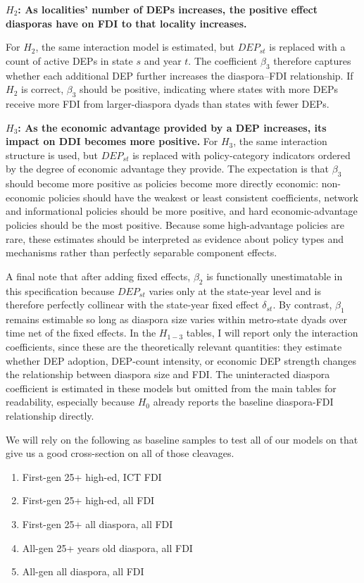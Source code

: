 \documentclass[12pt]{article}
\begin{document}
\textbf{$H_2$: As localities' number of DEPs increases, the positive effect diasporas have on FDI to that locality increases.}

For $H_2$, the same interaction model is estimated, but $DEP_{st}$ is replaced with a count of active DEPs in state $s$ and year $t$. The coefficient $\beta_3$ therefore captures whether each additional DEP further increases the diaspora--FDI relationship. If $H_2$ is correct, $\beta_3$ should be positive, indicating where states with more DEPs receive more FDI from larger-diaspora dyads than states with fewer DEPs.

\textbf{$H_3$: As the economic advantage provided by a DEP increases, its impact on DDI becomes more positive.
}
For $H_3$, the same interaction structure is used, but $DEP_{st}$ is replaced with policy-category indicators ordered by the degree of economic advantage they provide. The expectation is that $\beta_3$ should become more positive as policies become more directly economic: non-economic policies should have the weakest or least consistent coefficients, network and informational policies should be more positive, and hard economic-advantage policies should be the most positive. Because some high-advantage policies are rare, these estimates should be interpreted as evidence about policy types and mechanisms rather than perfectly separable component effects.

A final note that after adding fixed effects, $\beta_2$ is functionally unestimatable in this specification because $DEP_{st}$ varies only at the state-year level and is therefore perfectly collinear with the state-year fixed effect $\delta_{st}$. By contrast, $\beta_1$ remains estimable so long as diaspora size varies within metro-state dyads over time net of the fixed effects. In the $H_{1-3}$ tables, I will report only the interaction coefficients, since these are the theoretically relevant quantities: they estimate whether DEP adoption, DEP-count intensity, or economic DEP strength changes the relationship between diaspora size and FDI. The uninteracted diaspora coefficient is estimated in these models but omitted from the main tables for readability, especially because $H_0$ already reports the baseline diaspora-FDI relationship directly.

We will rely on the following as baseline samples to test all of our models on that give us a good cross-section on all of those cleavages. 

\begin{enumerate}
    \item First-gen 25+ high-ed, ICT FDI
    \item First-gen 25+ high-ed, all FDI
    \item First-gen 25+ all diaspora, all FDI
    \item All-gen 25+ years old diaspora, all FDI
    \item All-gen all diaspora, all FDI
\end{enumerate}
\end{document}
